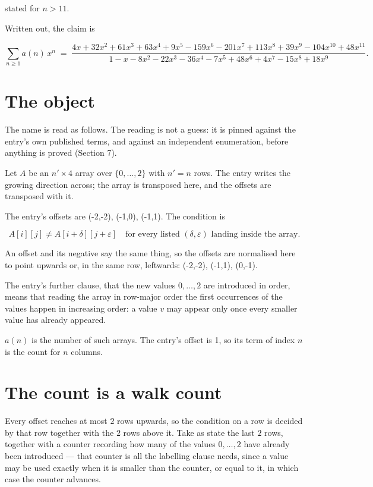 \documentclass[11pt]{article}
\theoremstyle{definition}
\begin{document}
stated for $n > 11$.

Written out, the claim is

\[\sum_{n \ge 1} a(n)\,x^n \;=\; \frac{4x + 32x^{2} + 61x^{3} + 63x^{4} + 9x^{5} - 159x^{6} - 201x^{7} + 113x^{8} + 39x^{9} - 104x^{10} + 48x^{11}}{1 - x - 8x^{2} - 22x^{3} - 36x^{4} - 7x^{5} + 48x^{6} + 4x^{7} - 15x^{8} + 18x^{9}}.\]

\section{The object}

The name is read as follows. The reading is not a guess: it is pinned against the entry's own published terms, and against an independent enumeration, before anything is proved (Section 7).

Let $A$ be an $n' \times 4$ array over $\{0,\dots,2\}$ with $n' = n$ rows. The entry writes the growing direction across; the array is transposed here, and the offsets are transposed with it.

The entry's offsets are (-2,-2), (-1,0), (-1,1). The condition is

\[A[i][j] \ne A[i{+}\delta][j{+}\varepsilon]\quad\text{for every listed }(\delta,\varepsilon)\text{ landing inside the array.}\]

An offset and its negative say the same thing, so the offsets are normalised here to point upwards or, in the same row, leftwards: (-2,-2), (-1,1), (0,-1).

The entry's further clause, that the new values $0,\dots,2$ are introduced in order, means that reading the array in row-major order the first occurrences of the values happen in increasing order: a value $v$ may appear only once every smaller value has already appeared.

$a(n)$ is the number of such arrays. The entry's offset is 1, so its term of index $n$ is the count for $n$ columns.

\section{The count is a walk count}

Every offset reaches at most $2$ rows upwards, so the condition on a row is decided by that row together with the $2$ rows above it. Take as state the last $2$ rows, together with a counter recording how many of the values $0,\dots,2$ have already been introduced --- that counter is all the labelling clause needs, since a value may be used exactly when it is smaller than the counter, or equal to it, in which case the counter advances.
\end{document}
